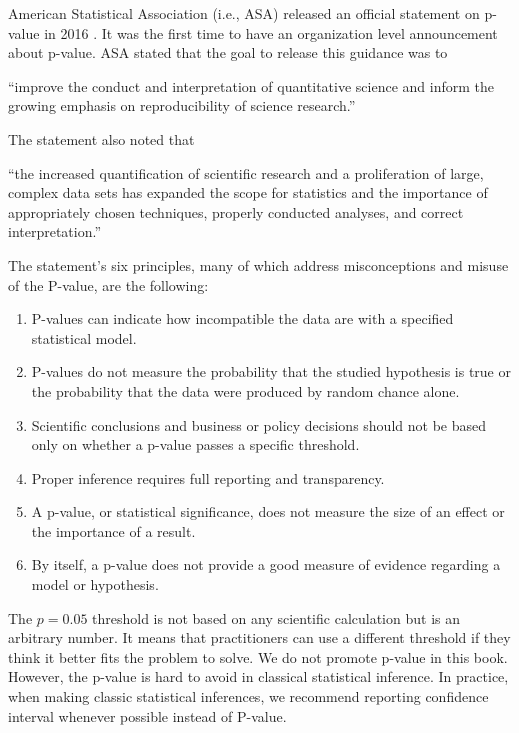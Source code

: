 \documentclass[12pt,]{krantz}
\providecommand{\tightlist}{%
  \setlength{\itemsep}{0pt}\setlength{\parskip}{0pt}}
\renewenvironment{quote}{\begin{VF}}{\end{VF}}
\begin{document}
American Statistical Association (i.e., ASA) released an official statement on p-value in 2016 \citep{ASA_P}. It was the first time to have an organization level announcement about p-value. ASA stated that the goal to release this guidance was to

\begin{quote}
``improve the conduct and interpretation of quantitative science and inform the growing emphasis on reproducibility of science research.''
\end{quote}

The statement also noted that

\begin{quote}
``the increased quantification of scientific research and a proliferation of large, complex data sets has expanded the scope for statistics and the importance of appropriately chosen techniques, properly conducted analyses, and correct interpretation.''
\end{quote}

The statement's six principles, many of which address misconceptions and misuse of the P-value, are the following:

\begin{enumerate}
\def\labelenumi{\arabic{enumi}.}
\tightlist
\item
  P-values can indicate how incompatible the data are with a specified statistical model.
\item
  P-values do not measure the probability that the studied hypothesis is true or the probability that the data were produced by random chance alone.
\item
  Scientific conclusions and business or policy decisions should not be based only on whether a p-value passes a specific threshold.
\item
  Proper inference requires full reporting and transparency.
\item
  A p-value, or statistical significance, does not measure the size of an effect or the importance of a result.
\item
  By itself, a p-value does not provide a good measure of evidence regarding a model or hypothesis.
\end{enumerate}

The \(p = 0.05\) threshold is not based on any scientific calculation but is an arbitrary number. It means that practitioners can use a different threshold if they think it better fits the problem to solve. We do not promote p-value in this book. However, the p-value is hard to avoid in classical statistical inference. In practice, when making classic statistical inferences, we recommend reporting confidence interval whenever possible instead of P-value.
\end{document}
